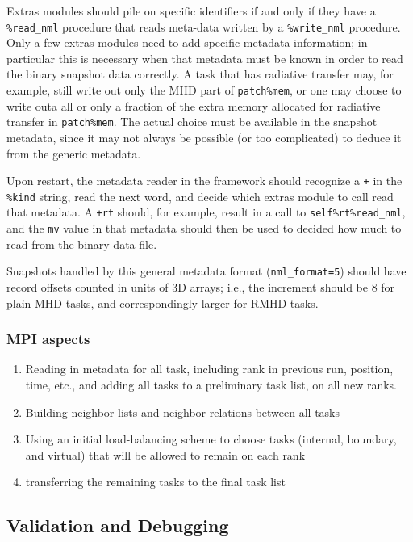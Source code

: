 \documentclass[paper=a4,fontsize=11pt]{scrartcl}
\numberwithin{equation}{section}		%
\numberwithin{figure}{section}			%
\numberwithin{table}{section}				%
\begin{document}
Extras modules should pile on specific identifiers if and only if they have a \verb|%read_nml| procedure that reads meta-data written by a \verb|%write_nml| procedure.  Only a few extras modules need to add specific metadata information; in particular this is necessary when that metadata must be known in order to read the binary snapshot data correctly.  A task that has radiative transfer may, for example, still write out only the MHD part of \verb|patch%mem|, or one may choose to write outa all or only a fraction of the extra memory allocated for radiative transfer in \verb|patch%mem|.  The actual choice must be available in the snapshot metadata, since it may not always be possible (or too complicated) to deduce it from the generic metadata.

Upon restart, the metadata reader in the framework should recognize a \verb|+| in the \verb|%kind| string, read the next word, and decide which extras module to call read that metadata.  A \verb|+rt| should, for example, result in a call to \verb|self%rt%read_nml|, and the \verb|mv| value in that metadata should then be used to decided how much to read from the binary data file.

Snapshots handled by this general metadata format (\verb|nml_format=5|) should have record offsets counted in units of 3D arrays; i.e., the increment should be 8 for plain MHD tasks, and correspondingly larger for RMHD tasks.

\subsubsection{MPI aspects}

\begin{enumerate}
    \item Reading in metadata for all task, including rank in previous run, position, time, etc., and adding all tasks to a preliminary task list, on all new ranks.
    \item Building neighbor lists and neighbor relations between all tasks
    \item Using an initial load-balancing scheme to choose tasks (internal, boundary, and virtual) that will be allowed to remain on each rank
    \item transferring the remaining tasks to the final task list
\end{enumerate}

\subsection{Validation and Debugging}
\end{document}
